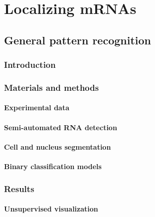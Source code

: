 
\graphicspath{{./figures/chapter5/}}

\chapter{Localizing mRNAs}
\label{ch:chapter5}

\minitoc
\newpage

\section{General pattern recognition}
\label{sec:general_pattern_recognition}

\subsection{Introduction}
\label{subsec:introduction_general_pattern}

\subsection{Materials and methods}
\label{subsec:materials_general_pattern}

\subsubsection{Experimental data}

\subsubsection{Semi-automated RNA detection}

\subsubsection{Cell and nucleus segmentation}

\subsubsection{Binary classification models}

\subsection{Results}
\label{subsec:results_general_pattern}

\subsubsection{Unsupervised visualization}

